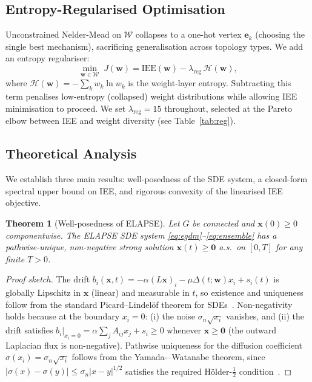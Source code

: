 \documentclass[review,12pt]{elsarticle}
\newcommand{\bfx}{\mathbf{x}}
\newcommand{\bfw}{\mathbf{w}}
\newcommand{\IEE}{\mathrm{IEE}}
\newtheorem{theorem}{Theorem}
\begin{document}
\subsection{Entropy-Regularised Optimisation}

Unconstrained Nelder-Mead on $\mathcal{W}$ collapses to a one-hot vertex
$\mathbf{e}_k$ (choosing the single best mechanism), sacrificing
generalisation across topology types. We add an entropy regulariser:
\begin{equation}
  \min_{\bfw \in \mathcal{W}}\; J(\bfw)
    = \IEE(\bfw) - \lambda_{\mathrm{reg}}\,\mathcal{H}(\bfw),
  \label{eq:objective}
\end{equation}
where $\mathcal{H}(\bfw) = -\sum_k w_k \ln w_k$ is the weight-layer
entropy. Subtracting this term penalises low-entropy (collapsed) weight
distributions while allowing IEE minimisation to proceed. We set
$\lambda_{\mathrm{reg}} = 15$ throughout, selected at the Pareto elbow
between IEE and weight diversity (see Table~\ref{tab:reg}).

\subsection{Theoretical Analysis}
\label{sec:theory}

We establish three main results: well-posedness of the SDE system, a
closed-form spectral upper bound on IEE, and rigorous convexity of the
linearised IEE objective.

\begin{theorem}[Well-posedness of ELAPSE]
\label{thm:wellposed}
Let $G$ be connected and $\bfx(0) \geq 0$ componentwise.
The ELAPSE SDE system \eqref{eq:egdm}--\eqref{eq:ensemble} has a
pathwise-unique, non-negative strong solution $\bfx(t) \geq \mathbf{0}$
a.s.\ on $[0,T]$ for any finite $T > 0$.
\end{theorem}

\begin{proof}[Proof sketch]
The drift $b_i(\bfx,t) = -\alpha(L\bfx)_i - \mu\Delta(t;\bfw)x_i + s_i(t)$
is globally Lipschitz in $\bfx$ (linear) and measurable in $t$, so
existence and uniqueness follow from the standard Picard--Lindelöf
theorem for SDEs~\cite{oksendal2003stochastic}.
Non-negativity holds because at the boundary $x_i = 0$: (i) the noise
$\sigma_n\sqrt{x_i}$ vanishes, and (ii) the drift satisfies
$b_i|_{x_i=0} = \alpha\!\sum_j A_{ij}x_j + s_i \geq 0$ whenever
$\bfx \geq \mathbf{0}$ (the outward Laplacian flux is non-negative).
Pathwise uniqueness for the diffusion coefficient
$\sigma(x_i) = \sigma_n\sqrt{x_i}$ follows from the
Yamada-–Watanabe theorem, since
$|\sigma(x) - \sigma(y)| \leq \sigma_n |x-y|^{1/2}$ satisfies the required
Hölder-$\tfrac{1}{2}$ condition~\cite{oksendal2003stochastic}.
\end{proof}
\end{document}
